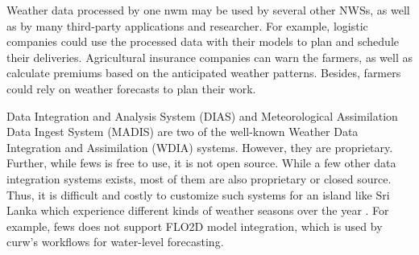 Weather data processed by one \acrshort{nwm} may be used by several other NWSs, as well as by many third-party applications and researcher. For example, logistic companies could use the processed data with their models to plan and schedule their deliveries. Agricultural insurance companies can warn the farmers, as well as calculate premiums based on the anticipated weather patterns. Besides, farmers could rely on weather forecasts to plan their work. %

Data Integration and Analysis System (DIAS) \cite{Kawasaki2018DataReduction} and Meteorological Assimilation Data Ingest System (MADIS) \cite{Macdermaid2005ArchitectureP2.39} are two of the well-known Weather Data Integration and Assimilation (WDIA) systems. However, they are proprietary. Further, while \acrfull{fews} \cite{Werner2013TheSystem} is free to use, it is not open source. While a few other data integration systems exists, most of them are also proprietary or closed source. Thus, it is difficult and costly to customize such systems for an island like Sri Lanka which experience different kinds of weather seasons over the year \cite{NaveendrakumarFiveLanka}. %
For example, \acrshort{fews} does not support FLO2D model integration, which is used by \acrshort{curw}'s workflows for water-level forecasting. %

